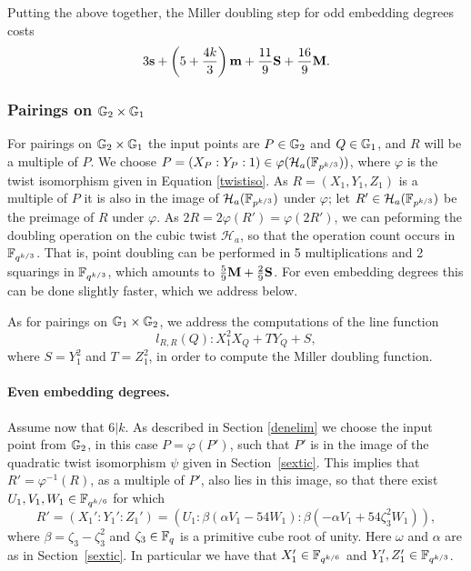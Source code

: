 Putting the above together, the Miller doubling step 
for odd embedding degrees costs
\begin{align*}
3\textbf{s} + \left(5 + \frac{4k}{3}\right)\textbf{m} + \frac{11}{9}\textbf{S} + \frac{16}{9}\textbf{M}.
\end{align*}

\subsubsection{Pairings on $\mathbb{G}_{2} \times \mathbb{G}_{1}$}

For pairings on $\mathbb{G}_{2} \times \mathbb{G}_{1}$ the input points are
$P \in \mathbb{G}_{2}$ and $Q \in \mathbb{G}_{1}$, and
$R$ will be a multiple of $P$.
We choose $P = (X_P:Y_P:1) \in \varphi(\mathcal{H}_a(\mathbb{F}_{p^{k/3}}))$, where $\varphi$
is the twist isomorphism given in Equation \eqref{twistiso}.
As $R=(X_1,Y_1,Z_1)$ is a multiple of $P$ it is also in the image of $\mathcal{H}_a(\mathbb{F}_{p^{k/3}})$ under $\varphi$; 
let $R' \in \mathcal{H}_a(\mathbb{F}_{p^{k/3}})$ be the preimage of $R$ under $\varphi$.
As $2R = 2\varphi(R') = \varphi(2R')$, 
we can peforming the doubling operation on the cubic twist $\mathcal{H}_a$, 
so that the operation count occurs in $\mathbb{F}_{q^{k/3}}$.
That is, point doubling can be performed in 5 multiplications and 2 squarings in $\mathbb{F}_{q^{k/3}}$, which amounts to $\frac{5}{9}\textbf{M} + \frac{2}{9}\textbf{S}$.
For even embedding degrees this can be done slightly faster, which we address below.

As for pairings on $\mathbb{G}_{1} \times \mathbb{G}_{2}$, 
we address the computations of the line function 
\begin{equation}\label{l2R}
l_{R,R}(Q): X_1^2 X_Q + T Y_Q + S,
\end{equation}
where $S = Y_1^2$ and $T = Z_1^2$,
in order to compute the Miller doubling function.

\paragraph*{Even embedding degrees.}

Assume now that $6|k$. 
As described in Section \ref{denelim}
we choose the input point from $\mathbb{G}_{2}$, 
in this case $P = \varphi(P')$, such that $P'$ is
in the image of the quadratic twist isomorphism $\psi$ given in 
Section~\ref{sextic}. 
This implies that $R' = \varphi^{-1}(R)$, 
as a multiple of $P'$, also lies in this image, 
so that there exist $U_1, V_1, W_1 \in \mathbb{F}_{q^{k/6}}$ for which
\begin{equation}\label{Rprime}
R' = (X_1':Y_1':Z_1') = (U_1:\beta(\alpha V_1 - 54W_1) : \beta(-\alpha V_1 + 54\zeta_3^2 W_1)),
\end{equation}
where $\beta = \zeta_3-\zeta_3^2$ and 
$\zeta_3 \in \mathbb{F}_{q}$ is a primitive cube root of unity.
Here $\omega$ and $\alpha$ are as in Section~\ref{sextic}.
In particular we have that $X_1' \in \mathbb{F}_{q^{k/6}}$ and
$Y_1',Z_1' \in \mathbb{F}_{q^{k/3}}$.

